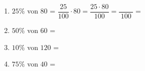 \begin{enumerate}[label=\arabic*.]
    \begin{enumerate}[label=\alph*)]
        \item $25\%$ von $80$ = $\dfrac{25}{100} \cdot 80 = \dfrac{25 \cdot 80}{100} = \dfrac{\phantom{0000}}{100} = $ \underline{\hspace{2cm}}

        \vspace{0.5cm}

        \item $50\%$ von $60$ = \underline{\hspace{4cm}}

        \vspace{0.5cm}

        \item $10\%$ von $120$ = \underline{\hspace{4cm}}

        \vspace{0.5cm}

        \item $75\%$ von $40$ = \underline{\hspace{4cm}}
    \end{enumerate}

    \end{enumerate}